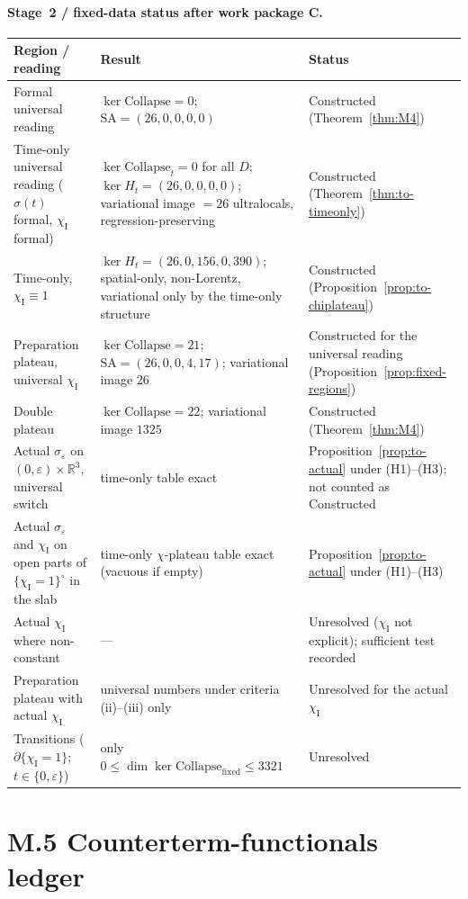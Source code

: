 \documentclass{article}
\theoremstyle{remark}
\newcommand{\sigeps}{\sigma_\varepsilon}
\newcommand{\chiI}{\chi_{\mathrm I}}
\newcommand{\Coll}{\mathrm{Collapse}}
\begin{document}
\paragraph{Stage~2 / fixed-data status after work package C.}
\begin{center}
\small
\begin{longtable}{p{}p{}p{}}
\hline
Region / reading & Result & Status\\
\hline
\endhead
Formal universal reading & $\ker\Coll=0$; $\mathrm{SA}=(26,0,0,0,0)$ & Constructed (Theorem~\ref{thm:M4})\\
Time-only universal reading ($\sigma(t)$ formal, $\chiI$ formal) & $\ker\Coll_t=0$ for all $D$; $\ker H_t=(26,0,0,0,0)$; variational image $=26$ ultralocals, regression-preserving & Constructed (Theorem~\ref{thm:to-timeonly})\\
Time-only, $\chiI\equiv1$ & $\ker H_t=(26,0,156,0,390)$; spatial-only, non-Lorentz, variational only by the time-only structure & Constructed (Proposition~\ref{prop:to-chiplateau})\\
Preparation plateau, universal $\chiI$ & $\ker\Coll=21$; $\mathrm{SA}=(26,0,0,4,17)$; variational image $26$ & Constructed for the universal reading (Proposition~\ref{prop:fixed-regions})\\
Double plateau & $\ker\Coll=22$; variational image $1325$ & Constructed (Theorem~\ref{thm:M4})\\
Actual $\sigeps$ on $(0,\varepsilon)\times\mathbb R^3$, universal switch & time-only table exact & Proposition~\ref{prop:to-actual} under (H1)--(H3); not counted as Constructed\\
Actual $\sigeps$ and $\chiI$ on open parts of $\{\chiI=1\}^\circ$ in the slab & time-only $\chi$-plateau table exact (vacuous if empty) & Proposition~\ref{prop:to-actual} under (H1)--(H3)\\
Actual $\chiI$ where non-constant & --- & Unresolved ($\chiI$ not explicit); sufficient test recorded\\
Preparation plateau with actual $\chiI$ & universal numbers under criteria (ii)--(iii) only & Unresolved for the actual $\chiI$\\
Transitions ($\partial\{\chiI=1\}$; $t\in\{0,\varepsilon\}$) & only $0\le\dim\ker\Coll_{\mathrm{fixed}}\le3321$ & Unresolved\\
\hline
\end{longtable}
\end{center}


\section{M.5 Counterterm-functionals ledger}
\label{sec:m5}
\end{document}
